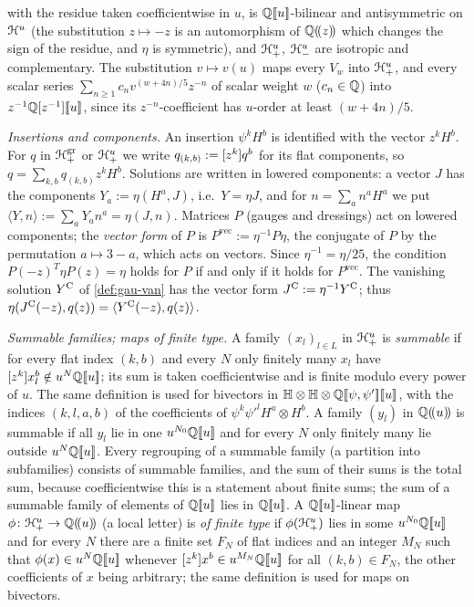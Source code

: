 \begin{conv}
\begin{description}
\[\]
with the residue taken coefficientwise in $u$, is $\mathbb{Q}[\![ u ]\!]$-bilinear and antisymmetric on $\mathcal{H}^u$ (the substitution $z\mapsto -z$ is an automorphism of $\mathbb{Q}(\!(z)\!)$ which changes the sign of the residue, and $\eta$ is symmetric), and $\mathcal{H}^u_+$, $\mathcal{H}^u_-$ are isotropic and complementary. The substitution $v\mapsto v(u)$ maps every $V_w$ into $\mathcal{H}^u_+$, and every scalar series $\sum_{n\geq 1}c_nv^{(w+4n)/5}z^{-n}$ of scalar weight $w$ ($c_n\in\mathbb{Q}$) into $z^{-1}\mathbb{Q}[z^{-1}][\![ u ]\!]$, since its $z^{-n}$-coefficient has $u$-order at least $(w+4n)/5$.
\end{description}
\emph{Insertions and components.} An insertion $\psi^kH^b$ is identified with the vector $z^kH^b$. For $q$ in $\mathcal{H}^{\mathrm{gr}}_+$ or $\mathcal{H}^u_+$ we write $q_{(k,b)} := [z^k]q^b$ for its flat components, so $q = \sum_{k,b}q_{(k,b)}z^kH^b$. Solutions are written in lowered components: a vector $J$ has the components $Y_a := \eta(H^a,J)$, i.e.\ $Y = \eta J$, and for $n = \sum_an^aH^a$ we put $\langle Y,n\rangle := \sum_aY_an^a = \eta(J,n)$. Matrices $P$ (gauges and dressings) act on lowered components; the \emph{vector form} of $P$ is $P^{\mathrm{vec}} := \eta^{-1}P\eta$, the conjugate of $P$ by the permutation $a\mapsto 3-a$, which acts on vectors. Since $\eta^{-1} = \eta/25$, the condition $P(-z)^T\eta P(z) = \eta$ holds for $P$ if and only if it holds for $P^{\mathrm{vec}}$. The vanishing solution $Y^{\mathrm{C}}$ of \cref{def:gau-van} has the vector form $J^{\mathrm C} := \eta^{-1}Y^{\mathrm{C}}$; thus $\eta(J^{\mathrm C}(-z),q(z)) = \langle Y^{\mathrm{C}}(-z),q(z)\rangle$.

\emph{Summable families; maps of finite type.} A family $(x_l)_{l\in L}$ in $\mathcal{H}^u_+$ is \emph{summable} if for every flat index $(k,b)$ and every $N$ only finitely many $x_l$ have $[z^k]x_l^b\notin u^N\mathbb{Q}[\![ u ]\!]$; its sum is taken coefficientwise and is finite modulo every power of $u$. The same definition is used for bivectors in $\mathbb{H}\otimes\mathbb{H}\otimes\mathbb{Q}[\![ \psi,\psi' ]\!][\![ u ]\!]$, with the indices $(k,l,a,b)$ of the coefficients of $\psi^k\psi'^lH^a\otimes H^b$. A family $(y_l)$ in $\mathbb{Q}(\!(u)\!)$ is summable if all $y_l$ lie in one $u^{N_0}\mathbb{Q}[\![ u ]\!]$ and for every $N$ only finitely many lie outside $u^N\mathbb{Q}[\![ u ]\!]$. Every regrouping of a summable family (a partition into subfamilies) consists of summable families, and the sum of their sums is the total sum, because coefficientwise this is a statement about finite sums; the sum of a summable family of elements of $\mathbb{Q}[\![ u ]\!]$ lies in $\mathbb{Q}[\![ u ]\!]$. A $\mathbb{Q}[\![ u ]\!]$-linear map $\phi\colon\mathcal{H}^u_+\to\mathbb{Q}(\!(u)\!)$ (a local letter) is \emph{of finite type} if $\phi(\mathcal{H}^u_+)$ lies in some $u^{N_0}\mathbb{Q}[\![ u ]\!]$ and for every $N$ there are a finite set $F_N$ of flat indices and an integer $M_N$ such that $\phi(x)\in u^N\mathbb{Q}[\![ u ]\!]$ whenever $[z^k]x^b\in u^{M_N}\mathbb{Q}[\![ u ]\!]$ for all $(k,b)\in F_N$, the other coefficients of $x$ being arbitrary; the same definition is used for maps on bivectors.
\end{conv}

